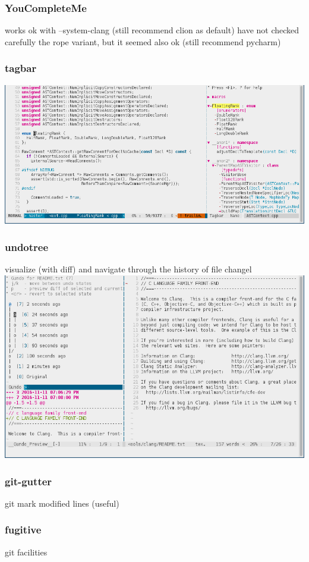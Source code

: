 \documentclass{beamer}
\begin{document}
\begin{frame}
  \frametitle{YouCompleteMe}
    works ok with --system-clang (still recommend clion as default)
    have not checked carefully the rope variant, but it seemed also ok (still recommend pycharm)
\end{frame}

\begin{frame}
  \frametitle{tagbar}
 \includegraphics[scale=0.33]{vim_tagbar_example.png}\\
\end{frame}

\begin{frame}
  \frametitle{undotree}
  visualize (with diff) and navigate through the history of file changel
 \includegraphics[scale=0.33]{vim_undotree_example.png}\\
\end{frame}

\begin{frame}
  \frametitle{git-gutter}
  git mark modified lines (useful)
\end{frame}

\begin{frame}
  \frametitle{fugitive}
  git facilities
\end{frame}
\end{document}
